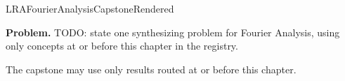 \ifcsname LRAFourierAnalysisCapstoneRendered\endcsname
\else
\expandafter\gdef\csname LRAFourierAnalysisCapstoneRendered\endcsname{}

\newpage
{}
\label{cap:fourier-analysis}

\begin{tcolorbox}[
  colback=gray!6,
  colframe=gray!40,
  arc=2pt,
  left=8pt, right=8pt, top=6pt, bottom=6pt,
  title={\small\textbf{Capstone Problem}},
  fonttitle=\small\bfseries
]
\textbf{Problem.}
TODO: state one synthesizing problem for Fourier Analysis, using only concepts at or
before this chapter in the registry.
\end{tcolorbox}

\begin{remark*}
The capstone may use only results routed at or before this chapter.
\end{remark*}

\clearpage
\fi

